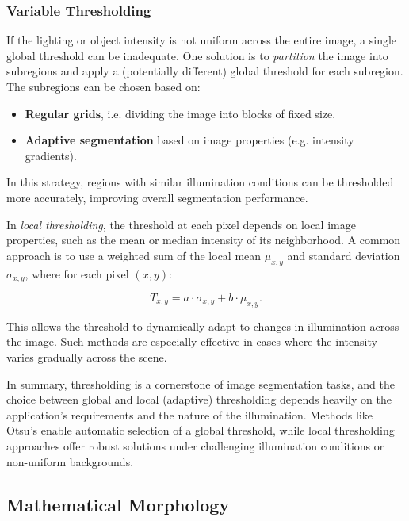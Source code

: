 \documentclass[a4paper,12pt]{article}
\begin{document}
\subsubsection{Variable Thresholding}

If the lighting or object intensity is not uniform across the entire image, a single global threshold can be inadequate. One solution is to \emph{partition} the image into subregions and apply a (potentially different) global threshold for each subregion. The subregions can be chosen based on:
\begin{itemize}
    \item \textbf{Regular grids}, i.e. dividing the image into blocks of fixed size.
    \item \textbf{Adaptive segmentation} based on image properties (e.g. intensity gradients).
\end{itemize}

In this strategy, regions with similar illumination conditions can be thresholded more accurately, improving overall segmentation performance.

In \emph{local thresholding}, the threshold at each pixel depends on local image properties, such as the mean or median intensity of its neighborhood. A common approach is to use a weighted sum of the local mean \(\mu_{x,y}\) and standard deviation \(\sigma_{x,y}\), where for each pixel \((x, y)\):

\[
T_{x,y} = a \cdot \sigma_{x,y} + b \cdot \mu_{x,y}.
\]

This allows the threshold to dynamically adapt to changes in illumination across the image. Such methods are especially effective in cases where the intensity varies gradually across the scene.

In summary, thresholding is a cornerstone of image segmentation tasks, and the choice between global and local (adaptive) thresholding depends heavily on the application’s requirements and the nature of the illumination. Methods like Otsu's enable automatic selection of a global threshold, while local thresholding approaches offer robust solutions under challenging illumination conditions or non-uniform backgrounds.

\subsection{Mathematical Morphology}

\end{document}
